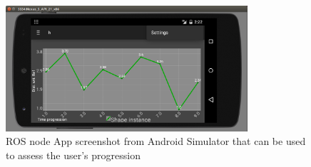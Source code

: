 \begin{figure}[h!]
        \centering
        \includegraphics[width=0.8\textwidth]{figures/plotApp.png}
        \caption{ROS node App screenshot from Android Simulator that can be used to assess the user's  progression}
        \label{fig:plotApp}
\end{figure}


